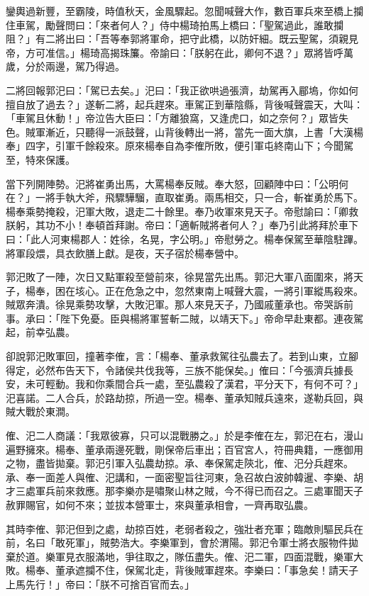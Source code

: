 鑾輿過新豐，至霸陵，時值秋天，金風驟起。忽聞喊聲大作，數百軍兵來至橋上攔住車駕，勵聲問曰：「來者何人？」侍中楊琦拍馬上橋曰：「聖駕過此，誰敢攔阻？」有二將出曰：「吾等奉郭將軍命，把守此橋，以防奸細。既云聖駕，須親見帝，方可准信。」楊琦高揭珠簾。帝諭曰：「朕躬在此，卿何不退？」眾將皆呼萬歲，分於兩邊，駕乃得過。

二將回報郭汜曰：「駕已去矣。」汜曰：「我正欲哄過張濟，劫駕再入郿塢，你如何擅自放了過去？」遂斬二將，起兵趕來。車駕正到華陰縣，背後喊聲震天，大叫：「車駕且休動！」帝泣告大臣曰：「方離狼窩，又逢虎口，如之奈何？」眾皆失色。賊軍漸近，只聽得一派鼓聲，山背後轉出一將，當先一面大旗，上書「大漢楊奉」四字，引軍千餘殺來。原來楊奉自為李傕所敗，便引軍屯終南山下；今聞駕至，特來保護。

當下列開陣勢。汜將崔勇出馬，大罵楊奉反賊。奉大怒，回顧陣中曰：「公明何在？」一將手執大斧，飛驟驊騮，直取崔勇。兩馬相交，只一合，斬崔勇於馬下。楊奉乘勢掩殺，汜軍大敗，退走二十餘里。奉乃收軍來見天子。帝慰諭曰：「卿救朕躬，其功不小！奉頓首拜謝。帝曰：「適斬賊將者何人？」奉乃引此將拜於車下曰：「此人河東楊郡人：姓徐，名晃，字公明。」帝慰勞之。楊奉保駕至華陰駐蹕。將軍段煨，具衣飲膳上獻。是夜，天子宿於楊奉營中。

郭汜敗了一陣，次日又點軍殺至營前來，徐晃當先出馬。郭汜大軍八面圍來，將天子，楊奉，困在垓心。正在危急之中，忽然東南上喊聲大震，一將引軍縱馬殺來。賊眾奔潰。徐晃乘勢攻擊，大敗汜軍。那人來見天子，乃國戚董承也。帝哭訴前事。承曰：「陛下免憂。臣與楊將軍誓斬二賊，以靖天下。」帝命早赴東都。連夜駕起，前幸弘農。

卻說郭汜敗軍回，撞著李傕，言：「楊奉、董承救駕往弘農去了。若到山東，立腳得定，必然布告天下，令諸侯共伐我等，三族不能保矣。」傕曰：「今張濟兵據長安，未可輕動。我和你乘間合兵一處，至弘農殺了漢君，平分天下，有何不可？」汜喜諾。二人合兵，於路劫掠，所過一空。楊奉、董承知賊兵遠來，遂勒兵回，與賊大戰於東澗。

傕、汜二人商議：「我眾彼寡，只可以混戰勝之。」於是李傕在左，郭汜在右，漫山遍野擁來。楊奉、董承兩邊死戰，剛保帝后車出；百官宮人，符冊典籍，一應御用之物，盡皆拋棄。郭汜引軍入弘農劫掠。承、奉保駕走陝北，傕、汜分兵趕來。承、奉一面差人與傕、汜講和，一面密聖旨往河東，急召故白波帥韓暹、李樂、胡才三處軍兵前來救應。那李樂亦是嘯聚山林之賊，今不得已而召之。三處軍聞天子赦罪賜官，如何不來；並拔本營軍士，來與董承相會，一齊再取弘農。

其時李傕、郭汜但到之處，劫掠百姓，老弱者殺之，強壯者充軍；臨敵則驅民兵在前，名曰「敢死軍」，賊勢浩大。李樂軍到，會於渭陽。郭汜令軍士將衣服物件拋棄於道。樂軍見衣服滿地，爭往取之，隊伍盡失。傕、汜二軍，四面混戰，樂軍大敗。楊奉、董承遮攔不住，保駕北走，背後賊軍趕來。李樂曰：「事急矣！請天子上馬先行！」帝曰：「朕不可捨百官而去。」


